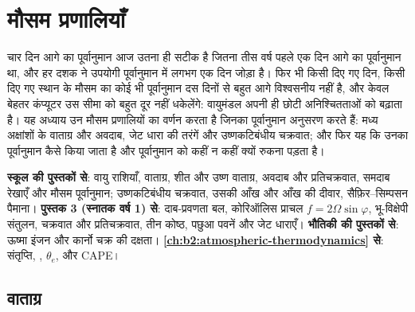 \chapter{मौसम प्रणालियाँ}\label{ch:b2:weather-systems}

चार दिन आगे का पूर्वानुमान आज उतना ही सटीक है जितना तीस वर्ष पहले एक दिन आगे का पूर्वानुमान था,
और हर दशक ने उपयोगी पूर्वानुमान में लगभग एक दिन जोड़ा है। फिर भी किसी दिए गए दिन, किसी दिए गए स्थान
के मौसम का कोई भी पूर्वानुमान दस दिनों से बहुत आगे विश्वसनीय नहीं है, और केवल बेहतर कंप्यूटर
उस सीमा को बहुत दूर नहीं धकेलेंगे: वायुमंडल अपनी ही छोटी अनिश्चितताओं को बढ़ाता है। यह अध्याय
उन मौसम प्रणालियों का वर्णन करता है जिनका पूर्वानुमान अनुसरण करते हैं: मध्य अक्षांशों के वाताग्र और अवदाब,
जेट धारा की तरंगें और उष्णकटिबंधीय चक्रवात; और फिर यह कि उनका पूर्वानुमान कैसे किया जाता है और
पूर्वानुमान को कहीं न कहीं क्यों रुकना पड़ता है।

\begin{recall}
\textbf{स्कूल की पुस्तकों से}: वायु राशियाँ, वाताग्र, शीत और उष्ण वाताग्र, अवदाब और
प्रतिचक्रवात, समदाब रेखाएँ और मौसम पूर्वानुमान; उष्णकटिबंधीय चक्रवात, उसकी आँख और आँख की दीवार,
सैफ़िर--सिम्पसन पैमाना। \textbf{पुस्तक 3 (स्नातक वर्ष 1) से}: दाब-प्रवणता बल,
कोरिऑलिस प्राचल $f = 2\Omega\sin\varphi$, भू-विक्षेपी संतुलन, चक्रवात और प्रतिचक्रवात,
तीन कोष्ठ, पछुआ पवनें और जेट धाराएँ। \textbf{भौतिकी की पुस्तकों से}: ऊष्मा इंजन
और कार्नो चक्र की दक्षता। \textbf{\cref{ch:b2:atmospheric-thermodynamics} से}:
संतृप्ति, , $\theta_e$,  और CAPE।
\end{recall}

\section{वाताग्र}\label{sec:b2:weather-systems:fronts}

